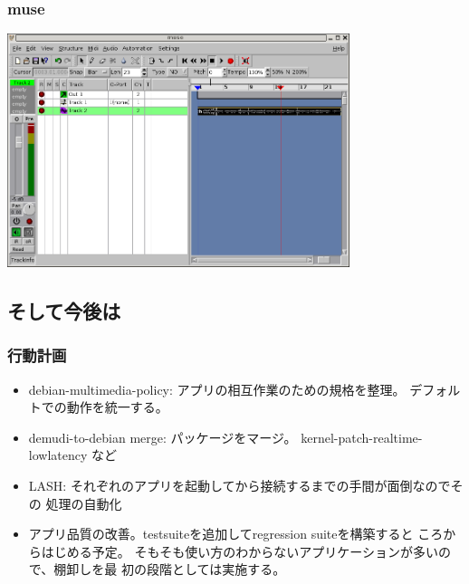 \documentclass[cjk,dvipdfmx]{beamer}
\begin{document}
\begin{frame}
 \frametitle{muse}
\includegraphics[width=10cm]{image200602/muse.png}
\end{frame}

 \subsection{そして今後は}
\begin{frame}
 \frametitle{行動計画}
\begin{itemize}
 \item debian-multimedia-policy: アプリの相互作業のための規格を整理。
 デフォルトでの動作を統一する。
 \item demudi-to-debian merge: パッケージをマージ。
       kernel-patch-realtime-lowlatency など
 \item LASH: それぞれのアプリを起動してから接続するまでの手間が面倒なのでその
       処理の自動化
 \item アプリ品質の改善。testsuiteを追加してregression suiteを構築すると
       ころからはじめる予定。
       そもそも使い方のわからないアプリケーションが多いので、棚卸しを最
       初の段階としては実施する。
\end{itemize}

\end{frame}
\end{document}

